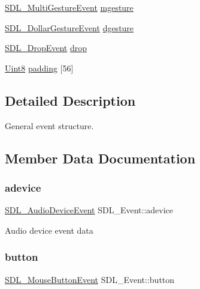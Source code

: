 \begin{DoxyCompactItemize}
\hyperlink{struct_s_d_l___multi_gesture_event}{S\+D\+L\+\_\+\+Multi\+Gesture\+Event} \hyperlink{union_s_d_l___event_ac19b3c6a6b5181a51eb4fbe2cbe726a9}{mgesture}
\item 
\hyperlink{struct_s_d_l___dollar_gesture_event}{S\+D\+L\+\_\+\+Dollar\+Gesture\+Event} \hyperlink{union_s_d_l___event_a4481167b9f8549aeb254e97ca812e74d}{dgesture}
\item 
\hyperlink{struct_s_d_l___drop_event}{S\+D\+L\+\_\+\+Drop\+Event} \hyperlink{union_s_d_l___event_acff77bccbca65abbb876360a3f5209c9}{drop}
\item 
\hyperlink{_s_d_l__stdinc_8h_a2944638813a090aa23e62f4da842c3e2}{Uint8} \hyperlink{union_s_d_l___event_aabb599570edfa54aad6255c1f24f2ad2}{padding} \mbox{[}56\mbox{]}
\end{DoxyCompactItemize}


\subsection{Detailed Description}
General event structure. 

\subsection{Member Data Documentation}
\mbox{\label{union_s_d_l___event_a111e01fcac4fd8e251a6058ff9f17e72}} 
\subsubsection{\texorpdfstring{adevice}{adevice}}
{\footnotesize\ttfamily \hyperlink{struct_s_d_l___audio_device_event}{S\+D\+L\+\_\+\+Audio\+Device\+Event} S\+D\+L\+\_\+\+Event\+::adevice}

Audio device event data \mbox{\label{union_s_d_l___event_ab6da2fa2687e5f849f270adecc64785f}} 
\subsubsection{\texorpdfstring{button}{button}}
{\footnotesize\ttfamily \hyperlink{struct_s_d_l___mouse_button_event}{S\+D\+L\+\_\+\+Mouse\+Button\+Event} S\+D\+L\+\_\+\+Event\+::button}

